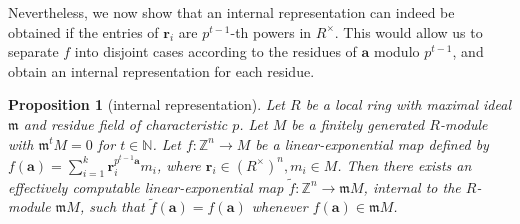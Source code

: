 \documentclass[letterpaper, 11pt, thm-restate]{article}
\numberwithin{equation}{section}
\newcommand{\Z}{\mathbb{Z}}
\newcommand{\N}{\mathbb{N}}
\newcommand{\ba}{\boldsymbol{a}}
\newcommand{\br}{\boldsymbol{r}}
\newcommand{\frm}{\mathfrak{m}}
\newtheorem{proposition}[theorem]{Proposition}
\theoremstyle{definition}
\theoremstyle{definition}
\theoremstyle{definition}
\begin{document}
Nevertheless, we now show that an internal representation can indeed be obtained if the entries of $\br_i$ are $p^{t-1}$-th powers in $R^{\times}$.
This would allow us to separate $f$ into disjoint cases according to the residues of $\ba$ modulo $p^{t-1}$, and obtain an internal representation for each residue.
\begin{proposition}[internal representation]\label{prop:internal_rep}
    Let $R$ be a local ring with maximal ideal $\frm$ and residue field of characteristic $p$.
    Let $M$ be a finitely generated $R$-module with $\frm^tM=0$ for $t \in \N$.
    Let $f:\Z^n\rightarrow M$ be a linear-exponential map defined by $f(\ba)=\sum_{i=1}^k \br_i^{p^{t-1}\ba}m_i$, where $\br_i\in (R^{\times})^n,m_i\in M$. 
    Then there exists an effectively computable linear-exponential map $\tilde f:\Z^n\rightarrow \frm M$, internal to the $R$-module $\frm M$, such that $\tilde f(\ba)=f(\ba)$ whenever $f(\ba)\in \frm M$. %
\end{proposition}
\end{document}
